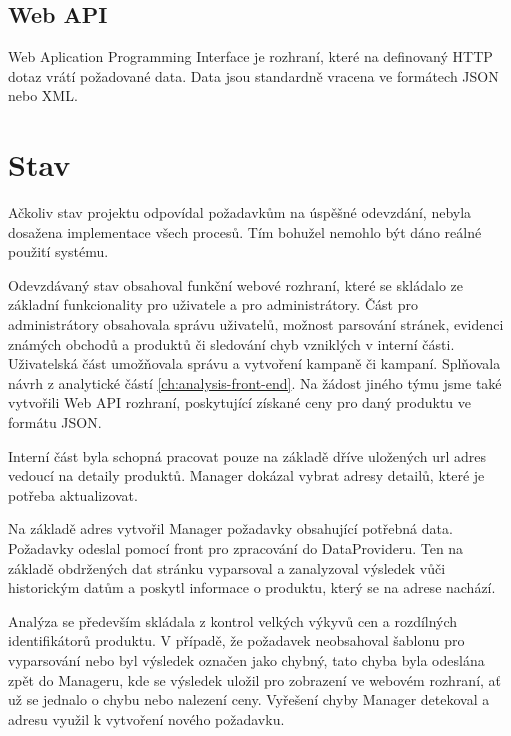 \documentclass[thesis=B,czech]{FITthesis}[2012/06/26]
\begin{document}
\subsection{Web API}
Web Aplication Programming Interface je rozhraní, které na definovaný HTTP dotaz vrátí požadované data. Data jsou standardně vracena ve formátech JSON nebo XML.

\section{Stav}
Ačkoliv stav projektu odpovídal požadavkům na úspěšné odevzdání, nebyla dosažena implementace všech procesů. Tím bohužel nemohlo být dáno reálné použití systému.
\par
Odevzdávaný stav obsahoval funkční webové rozhraní, které se skládalo ze základní funkcionality pro uživatele a pro administrátory.
Část pro administrátory obsahovala správu uživatelů, možnost parsování stránek, evidenci známých obchodů a produktů či sledování
chyb vzniklých v interní části.
Uživatelská část umožňovala správu a vytvoření kampaně či kampaní. Splňovala návrh z analytické částí \ref{ch:analysis-front-end}.
Na žádost jiného týmu jsme také vytvořili Web API rozhraní, poskytující získané ceny pro daný produktu ve formátu JSON.
\par
Interní část byla schopná pracovat pouze na základě dříve uložených url adres vedoucí na detaily produktů. 
Manager dokázal vybrat adresy detailů, které je potřeba aktualizovat.
\par
Na základě adres vytvořil Manager požadavky obsahující potřebná data. Požadavky odeslal pomocí front pro zpracování do DataProvideru. Ten na základě obdržených dat stránku vyparsoval a zanalyzoval výsledek vůči historickým datům a poskytl informace o produktu, který se na adrese nachází.
\par
Analýza se především skládala z kontrol velkých výkyvů cen a rozdílných identifikátorů produktu.
V případě, že požadavek neobsahoval šablonu pro vyparsování nebo byl výsledek označen jako chybný, tato chyba byla odeslána zpět do Manageru, kde se  výsledek uložil pro zobrazení ve webovém rozhraní, ať už se jednalo o chybu
nebo nalezení ceny. Vyřešení chyby Manager detekoval a adresu využil k vytvoření nového požadavku.
\end{document}
